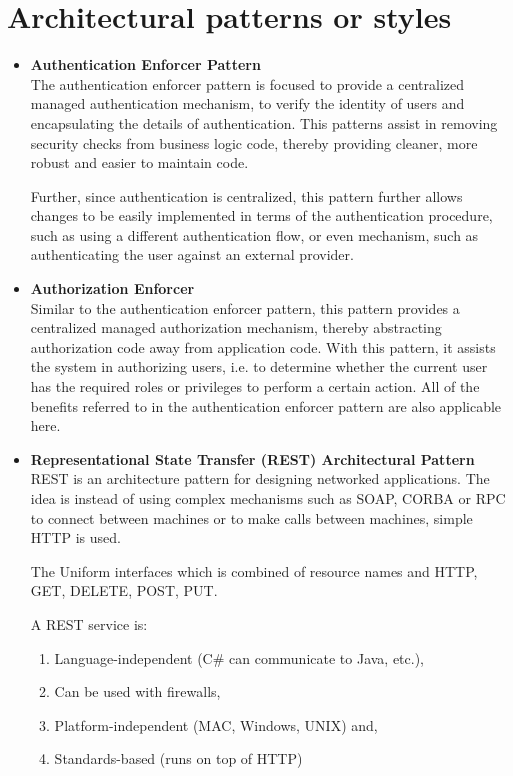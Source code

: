 \documentclass[a4paper,10pt]{article}
\begin{document}
\section{Architectural patterns or styles}
	\begin{itemize}
		\item \textbf{Authentication Enforcer Pattern} \\
		The authentication enforcer pattern is focused to provide a centralized managed authentication mechanism, to verify the identity of users and encapsulating the details of authentication. This patterns assist in removing security checks from business logic code, thereby providing cleaner, more robust and easier to maintain code.

		Further, since authentication is centralized, this pattern further allows changes to be easily implemented in terms of the authentication procedure, such as using a different authentication flow, or even mechanism, such as authenticating the user against an external provider.

		\item \textbf{Authorization Enforcer} \\
				Similar to the authentication enforcer pattern, this pattern provides a centralized managed authorization mechanism, thereby abstracting authorization code away from application code.  With this pattern, it assists the system in authorizing users, i.e. to determine whether the current user has the required roles or privileges to perform a certain action. All of the benefits referred to in the authentication enforcer pattern are also applicable here.

		\item \textbf{Representational State Transfer (REST) Architectural Pattern}\\
				REST is an architecture pattern for designing networked applications. The idea is instead of using complex mechanisms such as SOAP, CORBA or RPC to connect between machines or to make calls between machines, simple HTTP is used.

				The Uniform interfaces which is combined of resource names and HTTP, GET, DELETE, POST, PUT.

				A REST service is:
				\begin{enumerate}
					\item Language-independent (C\# can communicate to Java, etc.),
					\item Can be used with firewalls,
					\item Platform-independent (MAC, Windows, UNIX) and,
					\item Standards-based (runs on top of HTTP)
				\end{enumerate}


\end{itemize}
\end{document}
